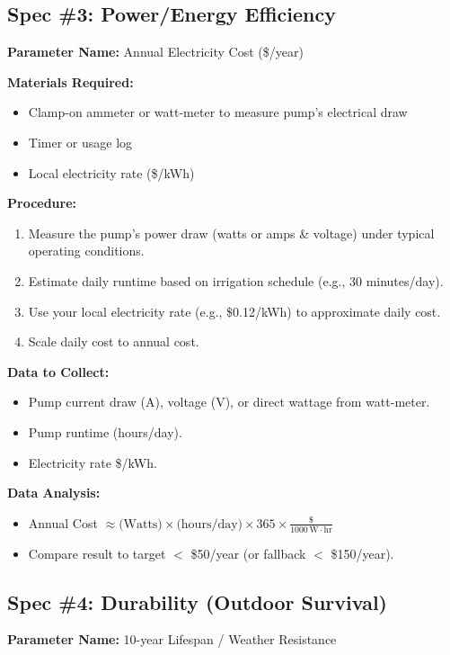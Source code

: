 \documentclass[12pt]{article}
\begin{document}
\vspace{1em}
\newpage\subsection*{Spec \#3: Power/Energy Efficiency}
\textbf{Parameter Name:} Annual Electricity Cost (\$/year)

\noindent
\textbf{Materials Required:}
\begin{itemize}
    \item Clamp-on ammeter or watt-meter to measure pump’s electrical draw
    \item Timer or usage log
    \item Local electricity rate (\$/kWh)
\end{itemize}

\noindent
\textbf{Procedure:}
\begin{enumerate}
    \item Measure the pump's power draw (watts or amps \& voltage) under typical operating conditions.
    \item Estimate daily runtime based on irrigation schedule (e.g., 30 minutes/day).
    \item Use your local electricity rate (e.g., \$0.12/kWh) to approximate daily cost.
    \item Scale daily cost to annual cost.
\end{enumerate}

\noindent
\textbf{Data to Collect:}
\begin{itemize}
    \item Pump current draw (A), voltage (V), or direct wattage from watt-meter.
    \item Pump runtime (hours/day).
    \item Electricity rate \$/kWh.
\end{itemize}

\noindent
\textbf{Data Analysis:}
\begin{itemize}
    \item Annual Cost $\approx \text{(Watts)} \times \text{(hours/day)} \times 365 \times \frac{\text{\$}}{1000\,\text{W}\cdot\text{hr}}$
    \item Compare result to target $<$ \$50/year (or fallback $<$ \$150/year).
\end{itemize}

\vspace{1em}
\newpage\subsection*{Spec \#4: Durability (Outdoor Survival)}
\textbf{Parameter Name:} 10-year Lifespan / Weather Resistance
\end{document}
